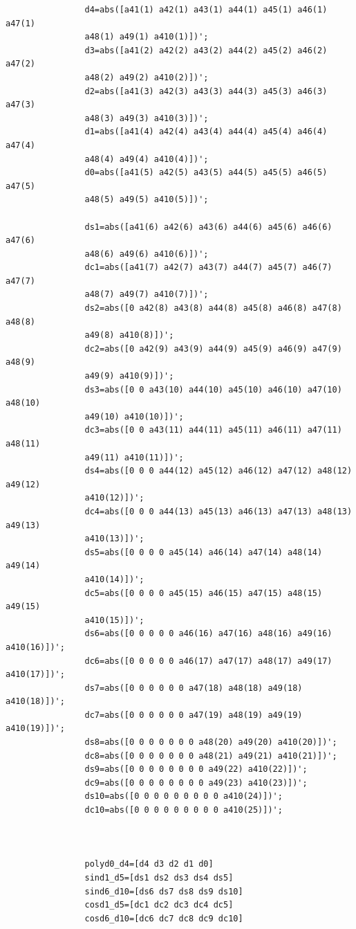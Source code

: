 \documentclass[11pt,a4paper]{article}
\begin{document}
\begin{enumerate}
\begin{enumerate}
\begin{enumerate}
\begin{verbatim}
				d4=abs([a41(1) a42(1) a43(1) a44(1) a45(1) a46(1) a47(1) 
				a48(1) a49(1) a410(1)])';
				d3=abs([a41(2) a42(2) a43(2) a44(2) a45(2) a46(2) a47(2) 
				a48(2) a49(2) a410(2)])';
				d2=abs([a41(3) a42(3) a43(3) a44(3) a45(3) a46(3) a47(3) 
				a48(3) a49(3) a410(3)])';
				d1=abs([a41(4) a42(4) a43(4) a44(4) a45(4) a46(4) a47(4) 
				a48(4) a49(4) a410(4)])';
				d0=abs([a41(5) a42(5) a43(5) a44(5) a45(5) a46(5) a47(5) 
				a48(5) a49(5) a410(5)])';

				ds1=abs([a41(6) a42(6) a43(6) a44(6) a45(6) a46(6) a47(6) 
				a48(6) a49(6) a410(6)])';
				dc1=abs([a41(7) a42(7) a43(7) a44(7) a45(7) a46(7) a47(7) 
				a48(7) a49(7) a410(7)])';
				ds2=abs([0 a42(8) a43(8) a44(8) a45(8) a46(8) a47(8) a48(8) 
				a49(8) a410(8)])';
				dc2=abs([0 a42(9) a43(9) a44(9) a45(9) a46(9) a47(9) a48(9) 
				a49(9) a410(9)])';
				ds3=abs([0 0 a43(10) a44(10) a45(10) a46(10) a47(10) a48(10) 
				a49(10) a410(10)])';
				dc3=abs([0 0 a43(11) a44(11) a45(11) a46(11) a47(11) a48(11) 
				a49(11) a410(11)])';
				ds4=abs([0 0 0 a44(12) a45(12) a46(12) a47(12) a48(12) a49(12) 
				a410(12)])';
				dc4=abs([0 0 0 a44(13) a45(13) a46(13) a47(13) a48(13) a49(13) 
				a410(13)])';
				ds5=abs([0 0 0 0 a45(14) a46(14) a47(14) a48(14) a49(14) 
				a410(14)])';
				dc5=abs([0 0 0 0 a45(15) a46(15) a47(15) a48(15) a49(15) 
				a410(15)])';
				ds6=abs([0 0 0 0 0 a46(16) a47(16) a48(16) a49(16) a410(16)])';
				dc6=abs([0 0 0 0 0 a46(17) a47(17) a48(17) a49(17) a410(17)])';
				ds7=abs([0 0 0 0 0 0 a47(18) a48(18) a49(18) a410(18)])';
				dc7=abs([0 0 0 0 0 0 a47(19) a48(19) a49(19) a410(19)])';
				ds8=abs([0 0 0 0 0 0 0 a48(20) a49(20) a410(20)])';
				dc8=abs([0 0 0 0 0 0 0 a48(21) a49(21) a410(21)])';
				ds9=abs([0 0 0 0 0 0 0 0 a49(22) a410(22)])';
				dc9=abs([0 0 0 0 0 0 0 0 a49(23) a410(23)])';
				ds10=abs([0 0 0 0 0 0 0 0 0 a410(24)])';
				dc10=abs([0 0 0 0 0 0 0 0 0 a410(25)])';



				polyd0_d4=[d4 d3 d2 d1 d0]
				sind1_d5=[ds1 ds2 ds3 ds4 ds5]
				sind6_d10=[ds6 ds7 ds8 ds9 ds10]
				cosd1_d5=[dc1 dc2 dc3 dc4 dc5]
				cosd6_d10=[dc6 dc7 dc8 dc9 dc10]
			\end{verbatim}
			
		\end{enumerate}
	\end{enumerate}
	
\end{enumerate}
\end{document}
